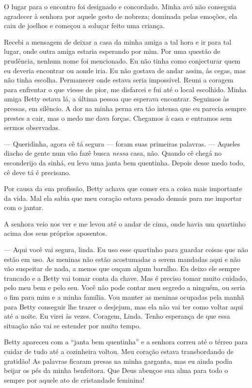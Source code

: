 O lugar para o encontro foi designado e concordado. Minha avó não
conseguia agradecer à senhora por aquele gesto de nobreza; dominada
pelas emoções, ela caiu de joelhos e começou a soluçar feito uma
criança.

Recebi a mensagem de deixar a casa da
minha amiga a tal hora e ir para tal lugar, onde outra amiga estaria
esperando por mim. Por uma questão de prudência, nenhum nome foi
mencionado. Eu não tinha como conjecturar quem eu deveria encontrar ou
aonde iria. Eu não gostava de andar assim, às cegas, mas não tinha
escolha. Permanecer onde estava seria impossível. Reuni a coragem para
enfrentar o que viesse de pior, me disfarcei e fui até o local
escolhido. Minha amiga Betty estava lá, a última pessoa que esperava
encontrar. Seguimos às pressas, em silêncio. A dor na minha perna era
tão intensa que eu parecia sempre prestes a cair, mas o medo me dava
forças. Chegamos à casa e entramos sem sermos observadas.

--- Queridinha, agora cê tá segura --- foram suas primeiras palavras.
--- Aqueles diacho de gente num vão fazê busca \emph{nessa} casa, não.
Quando cê chegá no esconderijo da sinhá, eu levo uma janta bem
quentinha. Depois desse medo todo, cê deve tá é precisano.

Por causa da sua profissão, Betty achava que comer era a coisa mais
importante da vida. Mal ela sabia que meu coração estava pesado demais
para me importar com o jantar.

A senhora veio nos ver e me levou até o
andar de cima, onde havia um quartinho acima dos seus próprios
aposentos.

--- Aqui você vai segura, linda. Eu uso esse quartinho para guardar
coisas que não estão em uso. As meninas não estão acostumadas a serem
mandadas aqui e não vão suspeitar de nada, a menos que ouçam algum
barulho. Eu deixo ele sempre trancado e a Betty vai tomar conta da
chave. Mas é preciso tomar muito cuidado, pelo meu bem e pelo seu. Você
não pode contar meu segredo a ninguém, ou seria o fim para mim e a minha
família. Vou manter as meninas ocupadas pela manhã para Betty conseguir
lhe trazer o desjejum, mas ela não vai ter como voltar aqui até a noite.
Eu virei às vezes. Coragem, Linda. Tenho esperança de que essa situação
não vai se estender por muito tempo.

Betty apareceu com a ``janta bem quentinha'' e a senhora correu até o
térreo para cuidar de tudo até a cozinheira voltou. Meu coração estava
transbordando de gratidão! As palavras ficaram presas na minha garganta,
mas eu ainda podia beijar os pés da minha benfeitora. Que Deus abençoe
sua alma para todo o sempre por aquele ato de cristandade feminina!

